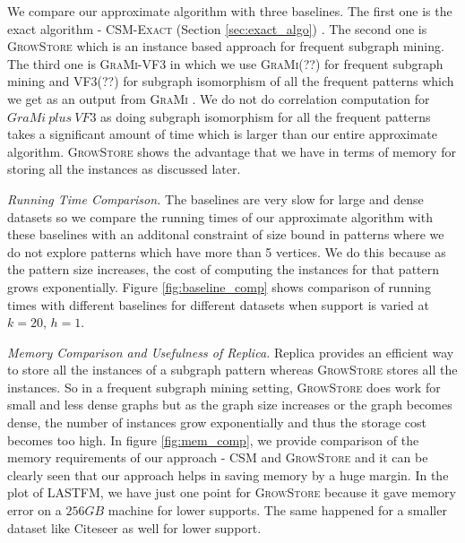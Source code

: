  We compare our approximate algorithm with three baselines. The first one is the exact algorithm - \textsc{CSM-Exact} (Section \ref{sec:exact_algo}) . The second one is \textsc{GrowStore} which is an instance based approach for frequent subgraph mining. The third one is \textsc{GraMi-VF3} in which we use \textsc{GraMi}(??) for frequent subgraph mining and \textsc{VF3}(??) for subgraph isomorphism of all the frequent patterns which we get as an output from \textsc{GraMi} . We do not do correlation computation for $GraMi\ plus\ VF3$ as doing subgraph isomorphism for all the frequent patterns takes a significant amount of time which is larger than our entire approximate algorithm. \textsc{GrowStore} shows the advantage that we have in terms of memory for storing all the instances as discussed later. 

\par \textit{Running Time Comparison.} The baselines are very slow for large and dense datasets so we compare the running times of our approximate algorithm with these baselines with an additonal constraint of size bound in patterns where we do not explore patterns which have more than 5 vertices. We do this because as the pattern size increases, the cost of computing the instances for that pattern grows exponentially. Figure \ref{fig:baseline_comp} shows comparison of running times with different baselines for different datasets when support is varied at $k=20$, $h=1$. 

\par{\textit{Memory Comparison and Usefulness of Replica.}} Replica provides an efficient way to store all the instances of a subgraph pattern whereas \textsc{GrowStore} stores all the instances. So in a frequent subgraph mining setting, \textsc{GrowStore} does work for small and less dense graphs but as the graph size increases or the graph becomes dense, the number of instances grow exponentially and thus the storage cost becomes too high. In figure \ref{fig:mem_comp}, we provide comparison of the memory requirements of our approach - \textsc{CSM} and \textsc{GrowStore} and it can be clearly seen that our approach helps in saving memory by a huge margin. In the plot of LASTFM, we have just one point for \textsc{GrowStore} because it gave memory error on a $256 GB$ machine for lower supports. The same happened for a smaller dataset like Citeseer as well for lower support. 

